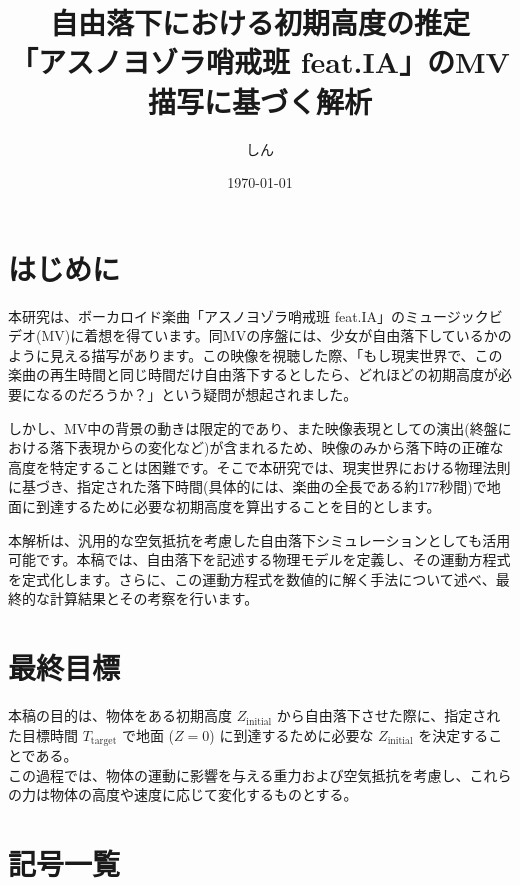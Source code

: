 \documentclass[a4paper,12pt]{article}
\title{自由落下における初期高度の推定 \\ \large 「アスノヨゾラ哨戒班 feat.IA」のMV描写に基づく解析}
\author{しん}
\date{\today}
\begin{document}
\maketitle


\tableofcontents
\newpage
\section{はじめに}
\label{sec:intro}

本研究は、ボーカロイド楽曲「アスノヨゾラ哨戒班 feat.IA」のミュージックビデオ(MV)に着想を得ています。同MVの序盤には、少女が自由落下しているかのように見える描写があります。この映像を視聴した際、「もし現実世界で、この楽曲の再生時間と同じ時間だけ自由落下するとしたら、どれほどの初期高度が必要になるのだろうか？」という疑問が想起されました。

しかし、MV中の背景の動きは限定的であり、また映像表現としての演出(終盤における落下表現からの変化など)が含まれるため、映像のみから落下時の正確な高度を特定することは困難です。そこで本研究では、現実世界における物理法則に基づき、指定された落下時間(具体的には、楽曲の全長である約177秒間)で地面に到達するために必要な初期高度を算出することを目的とします。

本解析は、汎用的な空気抵抗を考慮した自由落下シミュレーションとしても活用可能です。本稿では、自由落下を記述する物理モデルを定義し、その運動方程式を定式化します。さらに、この運動方程式を数値的に解く手法について述べ、最終的な計算結果とその考察を行います。

\section{最終目標}
本稿の目的は、物体をある初期高度 $Z_{\mathrm{initial}}$ から自由落下させた際に、指定された目標時間 $T_{\mathrm{target}}$ で地面 ($Z=0$) に到達するために必要な $Z_{\mathrm{initial}}$ を決定することである。\\
この過程では、物体の運動に影響を与える重力および空気抵抗を考慮し、これらの力は物体の高度や速度に応じて変化するものとする。

\section{記号一覧}
\label{sec:symbols}
\end{document}
